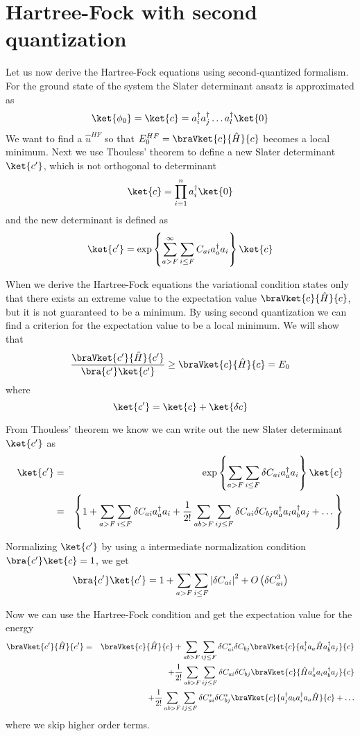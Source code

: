 \section{Hartree-Fock with second quantization}
	Let us now derive the Hartree-Fock equations using second-quantized formalism. For the ground state of the system the Slater determinant ansatz is approximated as
	\[
		\ket{\phi_0} = \ket{c} = a_{i}^{\dagger}a_{j}^{\dagger}\dots a_{l}^{\dagger}\ket{0}
	\]
	We want to find a $\hat{u}^{HF}$ so that $E_{0}^{HF}=\braVket{c}{\hat{H}}{c}$ becomes a local minimum. Next we use Thouless' theorem \cite{thouless60} to define a new Slater determinant $\ket{c'}$, which is not orthogonal to determinant 
	\[
		\ket{c}=\prod_{i=1}^{n}a_{i}^{\dagger}\ket{0}
	\]
	and the new determinant is defined as
	\[
		\ket{c'}=\exp \left\{ \sum_{a>F}^{\infty}\sum_{i\leq F} C_{ai}a_{a}^{\dagger}a_{i} \right\}\ket{c}
	\]

	When we derive the Hartree-Fock equations the variational condition states only that there exists an extreme value to the expectation value $\braVket{c}{\hat{H}}{c}$, but it is not guaranteed to be a minimum. By using second quantization we can find a criterion for the expectation value to be a local minimum. We will show that
	\[
		\frac{\braVket{c'}{\hat{H}}{c'}}{\bra{c'}\ket{c'}} \geq \braVket{c}{\hat{H}}{c}=E_0
	\]
	where
	\[
		\ket{c'}=\ket{c}+\ket{\delta c}
	\]

	From Thouless' theorem we know we can write out the new Slater determinant $\ket{c'}$ as
	\begin{eqnarray*}
		\ket{c'} & = & \exp\left\{ \sum_{a>F}\sum_{i\leq F}\delta C_{ai}a_{a}^{\dagger}a_{i}\right\} \ket{c}\\
	 	& = & \left\{ 1+\sum_{a>F}\sum_{i\leq F}\delta C_{ai}a_{a}^{\dagger}a_{i}+\frac{1}{2!}\sum_{ab>F}\sum_{ij\leq F}\delta C_{ai}\delta C_{bj}a_{a}^{\dagger}a_{i}a_{b}^{\dagger}a_{j}+\dots\right\} 
	\end{eqnarray*}

	Normalizing $\ket{c'}$ by using a intermediate normalization condition $\bra{c'}\ket{c}=1$, we get
	\[
		\bra{c'}\ket{c'}=1+\sum_{a>F}\sum_{i\leq F}\left | \delta C_{ai} \right |^{2} + O\left(\delta C_{ai}^{3}\right)
	\]

	Now we can use the Hartree-Fock condition and get the expectation value for the energy
	\begin{eqnarray} \label{eq:SQ_HF_EnergyExpVal}
		\braVket{c'}{\hat{H}}{c'} & = & \braVket{c}{\hat{H}}{c}+\sum_{ab>F}\sum_{ij\leq F}\delta C_{ai}^{*}\delta C_{bj}\braVket{c}{a_{i}^{\dagger}a_{a}\hat{H}a_{b}^{\dagger}a_{j}}{c}\\
		 &  & +\frac{1}{2!}\sum_{ab>F}\sum_{ij\leq F}\delta C_{ai}\delta C_{bj}\braVket{c}{\hat{H}a_{a}^{\dagger}a_{i}a_{b}^{\dagger}a_{j}}{c} \nonumber\\
		 &  & +\frac{1}{2!}\sum_{ab>F}\sum_{ij\leq F}\delta C_{ai}^{*}\delta C_{bj}^{*}\braVket{c}{a_{j}^{\dagger}a_{b}a_{i}^{\dagger}a_{a}\hat{H}}{c}+\dots \nonumber
	\end{eqnarray}
	where we skip higher order terms.

